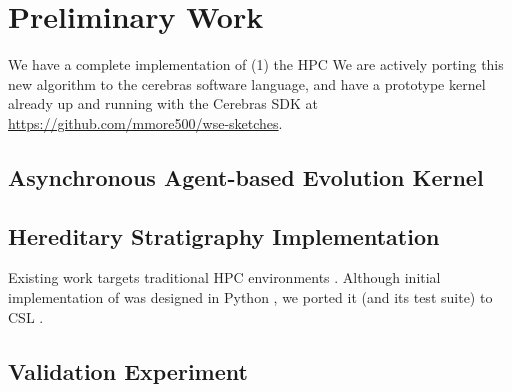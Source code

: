 \section{Preliminary Work} \label{sec:preliminary-work}

We have a complete implementation of (1) the HPC 
We are actively porting this new algorithm to the cerebras software language, and have a prototype kernel already up and running with the Cerebras SDK at \url{https://github.com/mmore500/wse-sketches}.

\subsection{Asynchronous Agent-based Evolution Kernel}

\subsection{Hereditary Stratigraphy Implementation}

Existing work targets traditional HPC environments \citep{moreno2022hstrat}.
Although initial implementation of was designed in Python \citep{moreno2024hsurf}, we ported it (and its test suite) to CSL \citep{moreno2024wse}.

\subsection{Validation Experiment}


